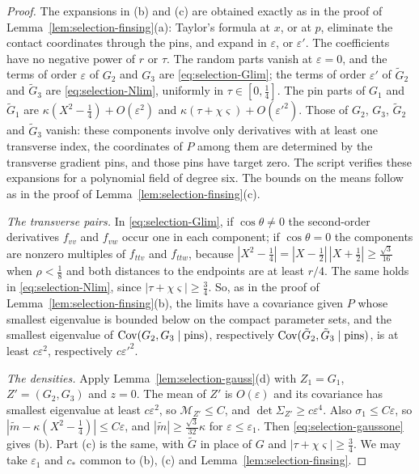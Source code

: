 \begin{proof}
The expansions in (b) and (c) are obtained exactly as in the proof of Lemma~\ref{lem:selection-finsing}(a): Taylor's formula at $x$, or at $p$, eliminate the contact coordinates through the pins, and expand in $\varepsilon$, or $\varepsilon'$. The coefficients have no negative power of $r$ or $\tau$. The random parts vanish at $\varepsilon=0$, and the terms of order $\varepsilon$ of $G_2$ and $G_3$ are \eqref{eq:selection-Glim}; the terms of order $\varepsilon'$ of $\tilde G_2$ and $\tilde G_3$ are \eqref{eq:selection-Nlim}, uniformly in $\tau\in[0,\frac14]$. The pin parts of $G_1$ and $\tilde G_1$ are $\kappa(X^2-\frac14)+O(\varepsilon^2)$ and $\kappa(\tau+\chi\varsigma)+O(\varepsilon'^2)$. Those of $G_2$, $G_3$, $\tilde G_2$ and $\tilde G_3$ vanish: these components involve only derivatives with at least one transverse index, the coordinates of $P$ among them are determined by the transverse gradient pins, and those pins have target zero. The script  verifies these expansions for a polynomial field of degree six. The bounds on the means follow as in the proof of Lemma~\ref{lem:selection-finsing}(c).

\emph{The transverse pairs.} In \eqref{eq:selection-Glim}, if $\cos\theta\ne0$ the second-order derivatives $f_{vv}$ and $f_{vw}$ occur one in each component; if $\cos\theta=0$ the components are nonzero multiples of $f_{ttv}$ and $f_{ttw}$, because $|X^2-\frac14|=|X-\frac12|\,|X+\frac12|\ge\frac{\sqrt3}{16}$ when $\rho<\frac18$ and both distances to the endpoints are at least $r/4$. The same holds in \eqref{eq:selection-Nlim}, since $|\tau+\chi\varsigma|\ge\frac34$. So, as in the proof of Lemma~\ref{lem:selection-finsing}(b), the limits have a covariance given $P$ whose smallest eigenvalue is bounded below on the compact parameter sets, and the smallest eigenvalue of $\operatorname{Cov}(G_2,G_3\mid\text{pins})$, respectively $\operatorname{Cov}(\tilde G_2,\tilde G_3\mid\text{pins})$, is at least $c\varepsilon^2$, respectively $c\varepsilon'^2$.

\emph{The densities.} Apply Lemma~\ref{lem:selection-gauss}(d) with $Z_1=G_1$, $Z'=(G_2,G_3)$ and $z=0$. The mean of $Z'$ is $O(\varepsilon)$ and its covariance has smallest eigenvalue at least $c\varepsilon^2$, so $\mathcal M_{Z'}\le C$, and $\det\Sigma_{Z'}\ge c\varepsilon^4$. Also $\sigma_1\le C\varepsilon$, so $|\tilde m-\kappa(X^2-\frac14)|\le C\varepsilon$, and $|\tilde m|\ge\frac{\sqrt3}{32}\kappa$ for $\varepsilon\le\varepsilon_1$. Then \eqref{eq:selection-gaussone} gives (b). Part (c) is the same, with $\tilde G$ in place of $G$ and $|\tau+\chi\varsigma|\ge\frac34$. We may take $\varepsilon_1$ and $c_*$ common to (b), (c) and Lemma~\ref{lem:selection-finsing}.


\end{proof}
